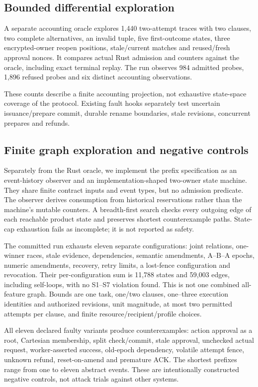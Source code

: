 \documentclass[letterpaper,twocolumn,10pt]{article}
\begin{document}
\subsection{Bounded differential exploration}

A separate accounting oracle explores 1,440 two-attempt traces with two clauses,
two complete alternatives, an invalid tuple, five first-outcome states, three
encrypted-owner reopen positions, stale/current matches and reused/fresh approval
nonces. It compares actual Rust admission and counters against the oracle,
including exact terminal replay. The run observes 984 admitted probes,
1,896 refused probes and six distinct accounting observations.

These counts describe a finite accounting projection, not exhaustive state-space
coverage of the protocol. Existing fault hooks separately test uncertain
issuance/prepare commit, durable rename boundaries, stale revisions, concurrent
prepares and refunds.

\subsection{Finite graph exploration and negative controls}

Separately from the Rust oracle, we implement the prefix specification as an
event-history observer and an implementation-shaped two-owner state machine.
They share finite contract inputs and event types, but no admission predicate.
The observer derives consumption from historical reservations rather than the
machine's mutable counters. A breadth-first search checks every outgoing edge
of each reachable product state and preserves shortest counterexample paths.
State-cap exhaustion fails as incomplete; it is not reported as safety.

The committed run exhausts eleven separate configurations: joint relations,
one-winner races, stale evidence, dependencies, semantic amendments, A--B--A
epochs, numeric amendments, recovery, retry limits, a lost-fence configuration
and revocation. Their per-configuration sum is 11,788 states and 59,003 edges,
including self-loops, with no S1--S7 violation found. This is not one combined
all-feature graph. Bounds are one task, one/two clauses, one--three execution
identities and authorized revisions, unit magnitude, at most two permitted
attempts per clause, and finite resource/recipient/profile choices.

All eleven declared faulty variants produce counterexamples: action approval
as a root, Cartesian membership, split check/commit, stale approval, unchecked
actual request, worker-asserted success, old-epoch dependency, volatile attempt
fence, unknown refund, reset-on-amend and premature ACK. The shortest prefixes
range from one to eleven abstract events. These are intentionally constructed
negative controls, not attack trials against other systems.
\end{document}
